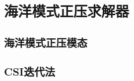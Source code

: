 \chapter{海洋模式正压求解器}
\label{cha:barosSolver}

\section{海洋模式正压模态}
\label{sec:baro}

\section{CSI迭代法}
\label{sec:csi}
